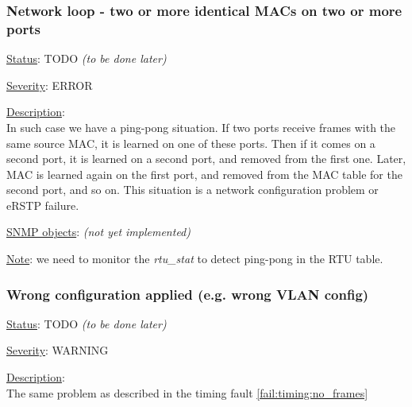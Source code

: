 \subsubsection{\bf Network loop - two or more identical MACs on two or more ports}
		\label{fail:data:net_loop}
		\begin{packed_enum}
			\item [] \underline{Status}: TODO \emph{(to be done later)}
			\item [] \underline{Severity}: ERROR
			\item [] \underline{Description}:\\
				In such case we have a ping-pong situation. If two ports receive frames
				with the same source MAC, it is learned on one of these ports. Then if
				it comes on a second port, it is learned on a second port, and removed
				from the first one. Later, MAC is learned again on the first port, and
				removed from the MAC table for the second port, and so on. This
				situation is a network configuration problem or eRSTP failure.
			\item [] \underline{SNMP objects}: \emph{(not yet implemented)}
			\item [] \underline{Note}: we need to monitor the \emph{rtu\_stat} to
				detect ping-pong in the RTU table.
		\end{packed_enum}

\subsubsection{\bf Wrong configuration applied (e.g. wrong VLAN config)}
		\begin{packed_enum}
			\item [] \underline{Status}: TODO \emph{(to be done later)}
			\item [] \underline{Severity}: WARNING
			\item [] \underline{Description}:\\
				The same problem as described in the timing fault
				\ref{fail:timing:no_frames}
		\end{packed_enum}

